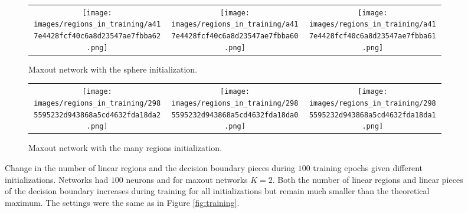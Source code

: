 \documentclass{article}
\theoremstyle{definition}
\begin{document}
\begin{figure}
    \begin{subfigure}{\textwidth}
        \setlength\tabcolsep{2pt}
        \begin{tabular}{ccc}
            \centering
            \texttt{[image: images/regions\_in\_training/a417e4428fcf40c6a8d23547ae7fbba62.png]} &
            \texttt{[image: images/regions\_in\_training/a417e4428fcf40c6a8d23547ae7fbba60.png]} &
            \texttt{[image: images/regions\_in\_training/a417e4428fcf40c6a8d23547ae7fbba61.png]}
        \end{tabular}
        \caption{\small Maxout network with the sphere initialization.}
    \end{subfigure}
    \vspace{.2cm}

    \begin{subfigure}{\textwidth}
        \setlength\tabcolsep{2pt}
        \begin{tabular}{ccc}
            \centering
            \texttt{[image: images/regions\_in\_training/2985595232d943868a5cd4632fda18da2.png]} & 
            \texttt{[image: images/regions\_in\_training/2985595232d943868a5cd4632fda18da0.png]} &
            \texttt{[image: images/regions\_in\_training/2985595232d943868a5cd4632fda18da1.png]}
        \end{tabular}
        \caption{\small Maxout network with the many regions initialization.}
    \end{subfigure}
    
    \caption{Change in the number of linear regions and the decision boundary pieces during $100$ training epochs given different initializations. Networks had $100$ neurons and for maxout networks $K=2$. Both the number of linear regions and linear pieces of the decision boundary increases during training for all initializations but remain much smaller than the theoretical maximum. The settings were the same as in Figure \ref{fig:training}.}
    \label{fig:init_in_training} 
\end{figure}
\end{document}
